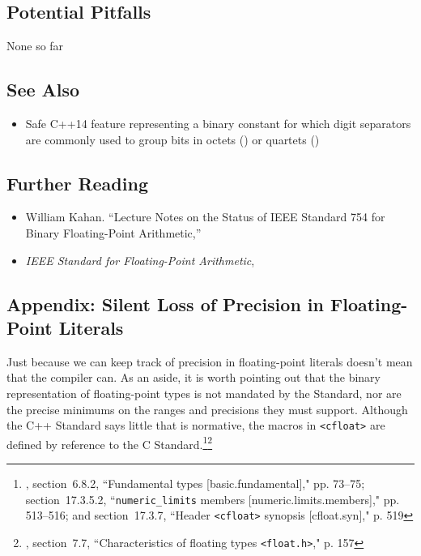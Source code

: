 \subsection[Potential Pitfalls]{Potential Pitfalls}\label{potential-pitfalls}

None so far

\subsection[See Also]{See Also}\label{see-also}

\begin{itemize}
\item{Safe C++14 feature representing a binary constant for which digit separators are commonly used to group bits in octets () or quartets ()}
\end{itemize}

\subsection[Further Reading]{Further Reading}\label{further-reading}

\begin{itemize}
\item{William Kahan. ``Lecture Notes on the Status of
IEEE Standard 754 for Binary Floating-Point Arithmetic,'' \cite{kahan97}}
\item{{\textit{IEEE Standard for Floating-Point Arithmetic}}, \cite{ieee19}}
\end{itemize}

\subsection[Appendix: Silent Loss of Precision in Floating-Point Literals]{Appendix: Silent Loss of Precision in Floating-Point Literals}\label{appendix:-silent-loss-of-precision-in-floating-point-literals}

Just because we can keep track of precision in floating-point literals
doesn't mean that the compiler can. As an aside, it is worth
pointing out that the binary representation of floating-point types is
not mandated by the Standard, nor are the precise minimums on the ranges
and precisions they must support. Although the C++ Standard says little
that is normative, the macros in \lstinline!<cfloat>! are defined by
reference to the C Standard.\footnote{\cite{iso20b}, section~6.8.2, ``Fundamental types [basic.fundamental]," pp. 73--75; section~17.3.5.2, ``\texttt{numeric\_limits} members [numeric.limits.members]," pp. 513--516; and section~17.3.7, ``Header \texttt{<cfloat>} synopsis [cfloat.syn]," p. 519}\footnote{\cite{iso18b}, section~7.7,
``Characteristics of floating types \texttt{<float.h>}," p. 157}

